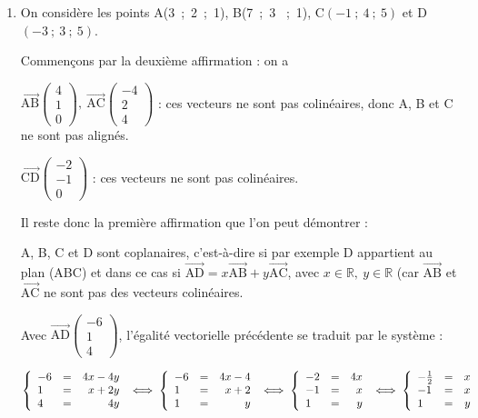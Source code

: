 \documentclass[10pt]{article}
\providecommand{\R}{\mathbb{R}}
\providecommand{\vect}[1]{\overrightarrow{#1}}
\begin{document}
\begin{enumerate}
\begin{enumerate}
	\end{enumerate}
\item On considère les points A(3~;~2~;~1), B(7~;~3 ~;~1), C$(-1~;~4~;~5)$ et D$(- 3~;~3~;~5)$.

Commençons par la deuxième affirmation : on a 

$\vect{\text{AB}}\begin{pmatrix}4\\1\\0\end{pmatrix}, \: \vect{\text{AC}}\begin{pmatrix}-4\\2\\4\end{pmatrix}$ : ces vecteurs ne sont pas colinéaires, donc A, B et C ne sont pas alignés.

$\vect{\text{CD}}\begin{pmatrix}-2\\-1\\0\end{pmatrix}$ : ces vecteurs ne sont pas colinéaires.

Il reste donc la première affirmation que l'on peut démontrer :

A, B, C et D sont coplanaires, c'est-à-dire si par exemple D appartient au plan (ABC) et dans ce cas si $\vect{\text{AD}} = x\vect{\text{AB}} + y\vect{\text{AC}}$, avec $x \in \R,\: y \in \R$ (car $\vect{\text{AB}}$ et $\vect{\text{AC}}$ ne sont pas des vecteurs colinéaires.

Avec $\vect{\text{AD}}\begin{pmatrix}-6\\1\\4\end{pmatrix}$, l'égalité vectorielle précédente se traduit par le système :

$\left\{\begin{array}{l c r}
-6&=&4x - 4y\\
1&=&x + 2y\\
4 &=& 4y
\end{array}\right. \iff \left\{\begin{array}{l c r}
-6&=&4x - 4\\
1&=&x + 2\\
1 &=& y
\end{array}\right. \iff
\left\{\begin{array}{l c r}
-2&=&4x\\
-1&=&x\\
1 &=& y
\end{array}\right. \iff \left\{\begin{array}{l c r}
-\frac12&=&x\\
-1&=&x\\
1 &=& y
\end{array}\right.$


\end{enumerate}
\end{document}
